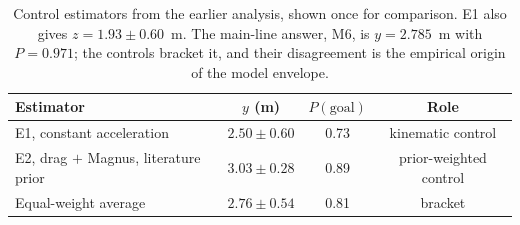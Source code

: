 \begin{table}[t]
  \centering
  \caption{Control estimators from the earlier analysis, shown once for
  comparison. E1 also gives $z=1.93\pm0.60$~m. The main-line answer, M6, is
  $y=2.785$~m with $P=0.971$; the controls bracket it, and their disagreement is
  the empirical origin of the model envelope.}
  \label{tab:controls}
  \small
  \begin{tabular}{@{}lccc@{}}
    \toprule
    Estimator & $y$ (m) & $P(\text{goal})$ & Role \\
    \midrule
    E1, constant acceleration & $2.50\pm0.60$ & 0.73 & kinematic control \\
    E2, drag $+$ Magnus, literature prior & $3.03\pm0.28$ & 0.89 & prior-weighted control \\
    Equal-weight average & $2.76\pm0.54$ & 0.81 & bracket \\
    \bottomrule
  \end{tabular}
\end{table}

